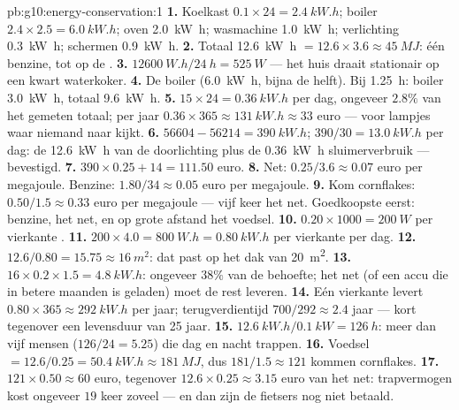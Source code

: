 \begin{solution}{pb:g10:energy-conservation:1}
\textbf{1.} Koelkast $0.1 \times 24 = \qty{2.4}{kW.h}$; boiler
$2.4 \times 2.5 = \qty{6.0}{kW.h}$; oven \qty{2.0}{kW.h}; wasmachine
\qty{1.0}{kW.h}; verlichting \qty{0.3}{kW.h}; schermen \qty{0.9}{kW.h}.
\textbf{2.} Totaal \qty{12.6}{kW.h} $= 12.6 \times 3.6 \approx
\qty{45}{MJ}$: één  benzine, tot op de .
\textbf{3.} $\qty{12600}{W.h}/\qty{24}{h} = \qty{525}{W}$ --- het huis
draait stationair op een kwart waterkoker.
\textbf{4.} De boiler (\qty{6.0}{kW.h}, bijna de helft). Bij
\qty{1.25}{h}: boiler \qty{3.0}{kW.h}, totaal \qty{9.6}{kW.h}.
\textbf{5.} $15 \times 24 = \qty{0.36}{kW.h}$ per dag, ongeveer $2.8\%$
van het gemeten totaal; per jaar $0.36 \times 365 \approx
\qty{131}{kW.h} \approx 33$ euro --- voor lampjes waar niemand naar
kijkt.
\textbf{6.} $56604 - 56214 = \qty{390}{kW.h}$;
$390/30 = \qty{13.0}{kW.h}$ per dag: de \qty{12.6}{kW.h} van de
doorlichting plus de \qty{0.36}{kW.h} sluimerverbruik --- bevestigd.
\textbf{7.} $390 \times 0.25 + 14 = 111.50$ euro.
\textbf{8.} Net: $0.25/3.6 \approx 0.07$ euro per megajoule. Benzine:
$1.80/34 \approx 0.05$ euro per megajoule.
\textbf{9.} Kom cornflakes: $0.50/1.5 \approx 0.33$ euro per megajoule
--- vijf keer het net. Goedkoopste eerst: benzine, het net, en op grote
afstand het voedsel.
\textbf{10.} $0.20 \times 1000 = \qty{200}{W}$ per vierkante .
\textbf{11.} $200 \times 4.0 = \qty{800}{W.h} = \qty{0.80}{kW.h}$ per
vierkante  per dag.
\textbf{12.} $12.6/0.80 = 15.75 \approx \qty{16}{m^2}$: dat past op het
dak van \qty{20}{m^2}.
\textbf{13.} $16 \times 0.2 \times 1.5 = \qty{4.8}{kW.h}$: ongeveer
$38\%$ van de behoefte; het net (of een accu die in betere maanden is
geladen) moet de rest leveren.
\textbf{14.} Eén vierkante  levert $0.80 \times 365 \approx
\qty{292}{kW.h}$ per jaar; terugverdientijd $700/292 \approx 2.4$ jaar
--- kort tegenover een levensduur van 25 jaar.
\textbf{15.} $\qty{12.6}{kW.h}/\qty{0.1}{kW} = \qty{126}{h}$: meer dan
vijf mensen ($126/24 = 5.25$) die dag en nacht trappen.
\textbf{16.} Voedsel $= 12.6/0.25 = \qty{50.4}{kW.h} \approx
\qty{181}{MJ}$, dus $181/1.5 \approx 121$ kommen cornflakes.
\textbf{17.} $121 \times 0.50 \approx 60$ euro, tegenover
$12.6 \times 0.25 \approx 3.15$ euro van het net: trapvermogen kost
ongeveer $19$ keer zoveel --- en dan zijn de fietsers nog niet betaald.

\end{solution}
